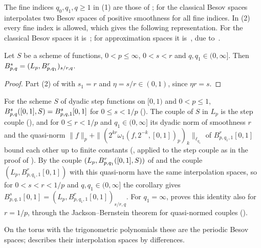The fine indices $q_0, q_1, q \geq 1$ in (1) are those of ; for
the classical Besov spaces \cite[Corollary~6.2]{DeVorePopovTAMS} interpolates two Besov spaces
of positive smoothness for all fine indices. In (2) every fine index is allowed, which gives
the following representation. For the classical Besov spaces it is~\cite[(4.32)]{DeVore1998};
for approximation spaces it is~\cite[\S 4.3, Theorem~2]{DeVore1998}, due
to~\cite{DeVorePopovLNM}.

\begin{corollary}
\label{cor:besov-representation}
\leanok
{}
Let $S$ be a scheme of functions, $0 < p \leq \infty$, $0 < s < r$ and $q, q_1 \in (0, \infty]$.
Then $B^{s}_{p,q} = (L_p, B^{r}_{p,q_1})_{s/r, q}$.
\end{corollary}

\begin{proof}
\leanok
{}
Part (2) of  with $s_1 = r$ and $\eta = s/r \in (0, 1)$, since
$\eta r = s$.
\end{proof}

For the scheme $S$ of dyadic step functions on $[0, 1)$ and $0 < p \leq 1$,
$B^{s}_{p,q}([0, 1], S) = B^s_{p,q,1}[0, 1]$ for $0 \leq s < 1/p$
(). The couple of $S$ in $L_p$ is the step couple
(), and for $0 \leq r < 1/p$ and $q_1 \in (0, \infty]$ its
dyadic norm of smoothness $r$ and the quasi-norm
$\|f\|_p + \|(2^{kr} \omega_1(f, 2^{-k}, [0, 1])_p)_k\|_{\ell_{q_1}}$ of $B^r_{p,q_1,1}[0, 1]$
bound each other up to finite constants (, applied to the
step couple as in the proof of ). By
 the couple $(L_p, B^{r}_{p,q_1}([0, 1], S))$ of
 and the couple $(L_p, B^r_{p,q_1,1}[0, 1])$ with this quasi-norm have
the same interpolation spaces, so for $0 < s < r < 1/p$ and $q, q_1 \in (0, \infty]$ the
corollary gives $B^s_{p,q,1}[0, 1] = (L_p, B^r_{p,q_1,1}[0, 1])_{s/r, q}$. For $q_1 = \infty$,
 proves this identity also for $r = 1/p$, through the
Jackson--Bernstein theorem for quasi-normed couples ().

On the torus with the trigonometric polynomials these are the periodic Besov spaces;
 describes their interpolation spaces by differences.

